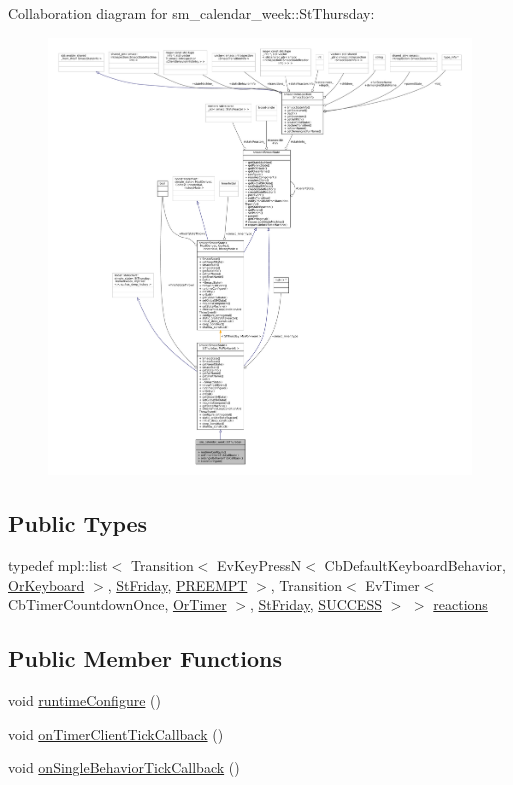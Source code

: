 Collaboration diagram for sm\+\_\+calendar\+\_\+week\+:\+:St\+Thursday\+:
\nopagebreak
\begin{figure}[H]
\begin{center}
\leavevmode
\includegraphics[width=350pt]{structsm__calendar__week_1_1StThursday__coll__graph}
\end{center}
\end{figure}
\subsection*{Public Types}
\begin{DoxyCompactItemize}
\item 
typedef mpl\+::list$<$ Transition$<$ Ev\+Key\+PressN$<$ Cb\+Default\+Keyboard\+Behavior, \hyperlink{classsm__calendar__week_1_1OrKeyboard}{Or\+Keyboard} $>$, \hyperlink{structsm__calendar__week_1_1StFriday}{St\+Friday}, \hyperlink{classPREEMPT}{P\+R\+E\+E\+M\+PT} $>$, Transition$<$ Ev\+Timer$<$ Cb\+Timer\+Countdown\+Once, \hyperlink{classsm__calendar__week_1_1OrTimer}{Or\+Timer} $>$, \hyperlink{structsm__calendar__week_1_1StFriday}{St\+Friday}, \hyperlink{classSUCCESS}{S\+U\+C\+C\+E\+SS} $>$ $>$ \hyperlink{structsm__calendar__week_1_1StThursday_a01b39d7646f8e0d4dba1fd189914951f}{reactions}
\end{DoxyCompactItemize}
\subsection*{Public Member Functions}
\begin{DoxyCompactItemize}
\item 
void \hyperlink{structsm__calendar__week_1_1StThursday_a39b3ce105c15a814a3f4a01ad439ceb3}{runtime\+Configure} ()
\item 
void \hyperlink{structsm__calendar__week_1_1StThursday_a70c4950d616a99cb68239fd9791e5c42}{on\+Timer\+Client\+Tick\+Callback} ()
\item 
void \hyperlink{structsm__calendar__week_1_1StThursday_a747d5d697bf66b1424b1b2fafcfdbcba}{on\+Single\+Behavior\+Tick\+Callback} ()
\end{DoxyCompactItemize}
